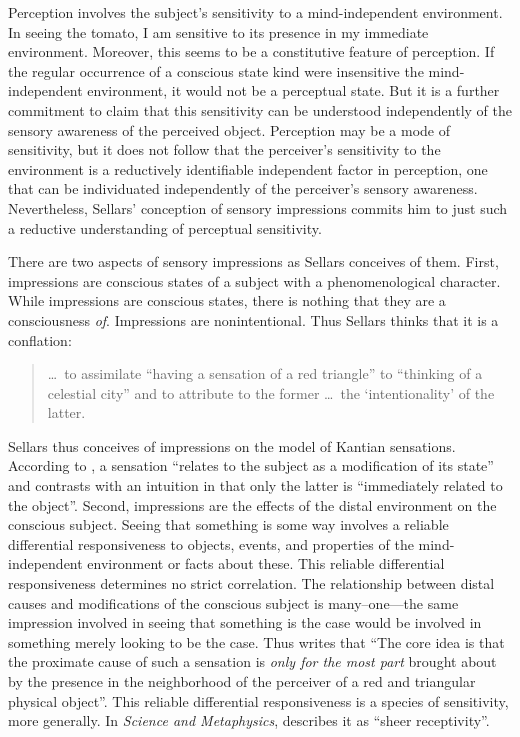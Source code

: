 \documentclass[12pt]{article}
\begin{document}
Perception involves the subject's sensitivity to a mind-independent environment. In seeing the tomato, I am sensitive to its presence in my immediate environment. Moreover, this seems to be a constitutive feature of perception. If the regular occurrence of a conscious state kind were insensitive the mind-independent environment, it would not be a perceptual state. But it is a further commitment to claim that this sensitivity can be understood independently of the sensory awareness of the perceived object. Perception may be a mode of sensitivity, but it does not follow that the perceiver's sensitivity to the environment is a reductively identifiable independent factor in perception, one that can be individuated independently of the perceiver's sensory awareness. Nevertheless, Sellars' conception of sensory impressions commits him to just such a reductive understanding of perceptual sensitivity.

There are two aspects of sensory impressions as Sellars conceives of them. First, impressions are conscious states of a subject with a phenomenological character. While impressions are conscious states, there is nothing that they are a consciousness \emph{of}. Impressions are nonintentional. Thus Sellars thinks that it is a conflation:
\begin{quote}
    \ldots\ to assimilate ``having a sensation of a red triangle'' to ``thinking of a celestial city'' and to attribute to the former \ldots\ the `intentionality' of the latter. \citep[§7]{Sellars:1956xp}
\end{quote}
Sellars thus conceives of impressions on the model of Kantian sensations. According to \citet[B376--7]{Kant:1781fk}, a sensation ``relates to the subject as a modification of its state'' and contrasts with  an intuition in that only the latter is ``immediately related to the object''. Second, impressions are the effects of the distal environment on the conscious subject. Seeing that something is some way involves a reliable differential responsiveness to objects, events, and properties of the mind-independent environment or facts about these. This reliable differential responsiveness determines no strict correlation. The relationship between distal causes and modifications of the conscious subject is many--one---the same impression involved in seeing that something is the case would be involved in something merely looking to be the case. Thus \citet[§7]{Sellars:1956xp} writes that ``The core idea is that the proximate cause of such a sensation is \emph{only for the most part} brought about by the presence in the neighborhood of the perceiver of a red and triangular physical object''. This reliable differential responsiveness is a species of sensitivity, more generally. In \emph{Science and Metaphysics}, \citet[4]{Sellars:1967uq} describes it as ``sheer receptivity''.
\end{document}

